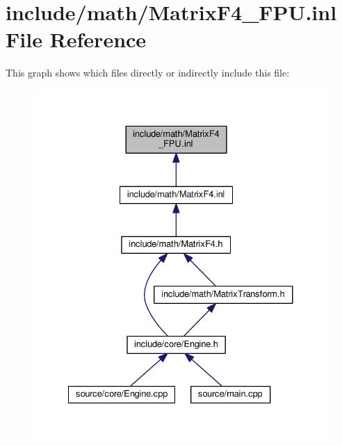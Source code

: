 \hypertarget{MatrixF4__FPU_8inl}{\section{include/math/\-Matrix\-F4\-\_\-\-F\-P\-U.inl File Reference}
\label{MatrixF4__FPU_8inl}
}
This graph shows which files directly or indirectly include this file\-:
\nopagebreak
\begin{figure}[H]
\begin{center}
\leavevmode
\includegraphics[width=330pt]{MatrixF4__FPU_8inl__dep__incl}
\end{center}
\end{figure}
